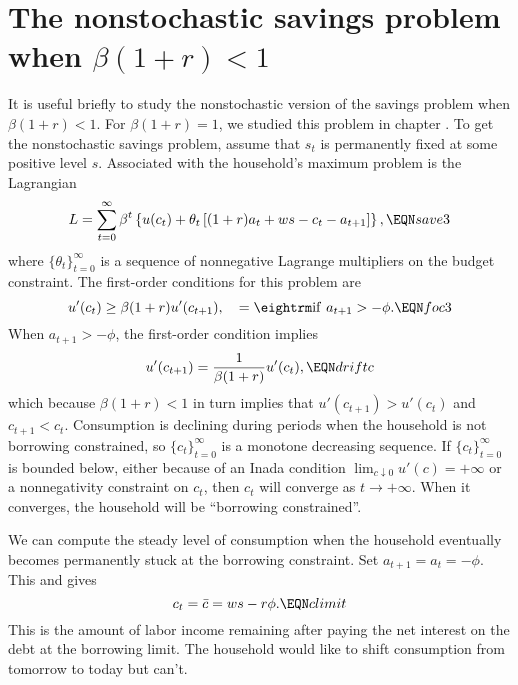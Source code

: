 \section{The nonstochastic savings problem when $\beta(1+r) < 1$}
It is useful briefly to study the nonstochastic version of the
savings problem when $\beta (1+r) < 1$.   For $\beta(1+r)=1$, we studied
this problem in chapter .
To get the nonstochastic
savings problem, assume that
$s_t$ is permanently fixed at some positive level $s$.     Associated with
the household's maximum  problem is the Lagrangian
%
$$ L =
 \sum_{t=0}^\infty \beta^t \left\{ u(c_t)
 + \theta_t \left[ (1+r) a_t + w s  - c_t -a_{t+1}  \right] \right\} ,
 \EQN save3 $$
where $\{\theta_t \}_{t=0}^\infty$ is a  sequence of
 nonnegative Lagrange multipliers on the budget constraint.
The first-order conditions for this problem are
$$ u'(c_t)   \geq \beta (1+r) u'(c_{t+1} ),
            \quad =   {\rm if}  \ a_{t+1} > - \phi.    \EQN foc3   $$
When $a_{t+1} > - \phi$, the first-order condition implies
$$u'(c_{t+1}) = {1 \over \beta (1+r) } u'(c_t), \EQN driftc $$
which because  $\beta (1+r) < 1 $ in turn implies that
$u'(c_{t+1}) > u'(c_t)$ and
$c_{t+1} < c_t$.
Consumption is declining during periods when the household
is not borrowing constrained, so  $\{c_t\}_{t=0}^\infty$ is a monotone decreasing
sequence. If  $\{c_t\}_{t=0}^\infty$  is bounded below, either because of an Inada condition
 $\lim_{c \downarrow 0} u'(c) = +\infty$ %
or a nonnegativity constraint on $c_t$,
then
$c_t$ will converge as $t \rightarrow +\infty$.   When it converges,
the household
will be ``borrowing constrained''.

 We can compute the steady level of consumption when
the household eventually becomes permanently stuck at the
borrowing constraint.
Set $a_{t+1} = a_t = - \phi$.  This and  gives
$$ c_t =  \bar c = w s - r \phi.  \EQN climit $$
This is the amount of labor income remaining after paying the
net interest on the debt at the borrowing limit.  The household would like
to shift consumption from tomorrow to today but can't.

